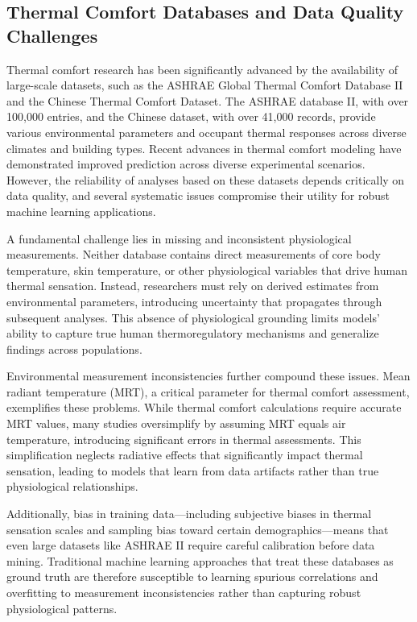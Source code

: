 \subsection{Thermal Comfort Databases and Data Quality Challenges}\label{seg:dbs}
Thermal comfort research has been significantly advanced by the availability of large-scale datasets, such as the ASHRAE Global Thermal Comfort Database II\cite{foldvary_licina_development_2018} and the Chinese Thermal Comfort Dataset\cite{yang2023comparative}. The ASHRAE database II, with over 100,000 entries, and the Chinese dataset, with over 41,000 records, provide various environmental parameters and occupant thermal responses across diverse climates and building types. Recent advances in thermal comfort modeling have demonstrated improved prediction across diverse experimental scenarios\cite{wang2018individual}. However, the reliability of analyses based on these datasets depends critically on data quality, and several systematic issues compromise their utility for robust machine learning applications.

A fundamental challenge lies in missing and inconsistent physiological measurements. Neither database contains direct measurements of core body temperature, skin temperature, or other physiological variables that drive human thermal sensation\cite{wangHumanThermalComfort2024}. Instead, researchers must rely on derived estimates from environmental parameters, introducing uncertainty that propagates through subsequent analyses. This absence of physiological grounding limits models' ability to capture true human thermoregulatory mechanisms and generalize findings across populations.

Environmental measurement inconsistencies further compound these issues. Mean radiant temperature (MRT), a critical parameter for thermal comfort assessment, exemplifies these problems. While thermal comfort calculations require accurate MRT values, many studies oversimplify by assuming MRT equals air temperature, introducing significant errors in thermal assessments. This simplification neglects radiative effects that significantly impact thermal sensation, leading to models that learn from data artifacts rather than true physiological relationships.

Additionally, bias in training data—including subjective biases in thermal sensation scales and sampling bias toward certain demographics—means that even large datasets like ASHRAE II require careful calibration before data mining\cite{xiongCalibratingSubjectiveData2024}. Traditional machine learning approaches\cite{luo_comparing_2020,al-sharifPredictingThermalPreferences2024,wangDimensionAnalysisSubjective2020b} that treat these databases as ground truth are therefore susceptible to learning spurious correlations and overfitting to measurement inconsistencies rather than capturing robust physiological patterns. 


